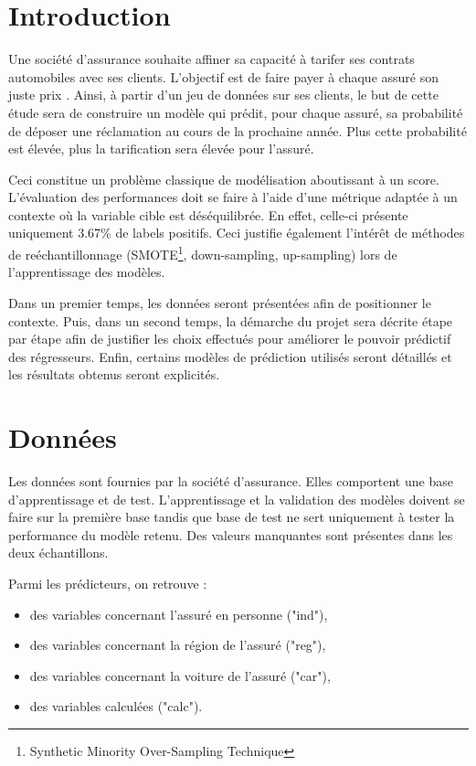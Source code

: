 \documentclass[french]{article}
\begin{document}
\begin{multicols}{2}
\section{Introduction}


Une société d'assurance souhaite affiner sa capacité à tarifer ses contrats automobiles avec ses clients. L'objectif est de faire payer à chaque assuré son \og juste prix \fg{}. Ainsi, à partir d'un jeu de données sur ses clients, le but de cette étude sera de construire un modèle qui prédit, pour chaque assuré, sa probabilité de déposer une réclamation au cours de la prochaine année. Plus cette probabilité est élevée, plus la tarification sera élevée pour l'assuré.


Ceci constitue un problème classique de modélisation aboutissant à un score. L'évaluation des performances doit se faire à l'aide d'une métrique adaptée à un contexte où la variable cible est déséquilibrée. En effet, celle-ci présente uniquement 3.67\% de labels positifs. Ceci justifie également l'intérêt de méthodes de reéchantillonnage (SMOTE\footnote{Synthetic Minority Over-Sampling Technique}, down-sampling, up-sampling) lors de l'apprentissage des modèles.

Dans un premier temps, les données seront présentées afin de positionner le contexte. Puis, dans un second temps, la démarche du projet sera décrite étape par étape afin de justifier les choix effectués pour améliorer le pouvoir prédictif des régresseurs. Enfin, certains modèles de prédiction utilisés seront détaillés et les résultats obtenus seront explicités.

\section{Données}

Les données sont fournies par la société d'assurance. Elles comportent une base d'apprentissage et de test. L'apprentissage et la validation des modèles doivent se faire sur la première base tandis que base de test ne sert uniquement à tester la performance du modèle retenu. Des valeurs manquantes sont présentes dans les deux échantillons.

Parmi les prédicteurs, on retrouve :
\begin{itemize}
    \item des variables concernant l'assuré en personne ("ind"),
    \item des variables concernant la région de l'assuré ("reg"),
    \item des variables concernant la voiture de l'assuré ("car"),
    \item des variables calculées ("calc").
\end{itemize}


\end{multicols}
\end{document}
